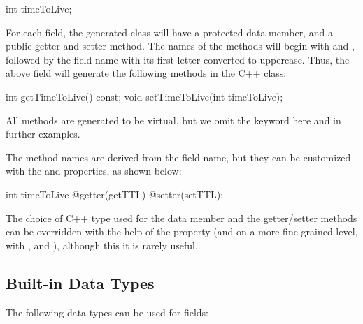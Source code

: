 \begin{msg}
int timeToLive;
\end{msg}

For each field, the generated class will have a protected data member, and a
public getter and setter method. The names of the methods will begin with
 and , followed by the field name with its first letter
converted to uppercase. Thus, the above field will generate the following
methods in the C++ class:

\begin{cpp}
int getTimeToLive() const;
void setTimeToLive(int timeToLive);
\end{cpp}

\begin{note}
All methods are generated to be virtual, but we omit the 
keyword here and in further examples.
\end{note}

The method names are derived from the field name, but they can be customized
with the  and  properties, as shown below:

\begin{msg}
int timeToLive @getter(getTTL) @setter(setTTL);
\end{msg}

The choice of C++ type used for the data member and the getter/setter methods
can be overridden with the help of the  property (and on a more
fine-grained level, with ,  and
), although this it is rarely useful.


\subsection{Built-in Data Types}
\label{sec:msg-defs:field-data-types}

The following data types can be used for fields:

